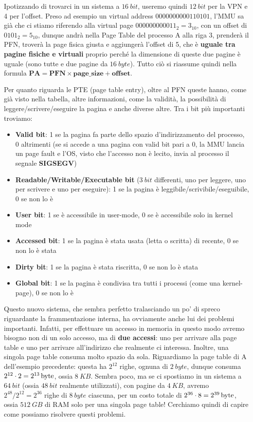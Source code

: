 \documentclass[11pt, a4paper, titlepage, oneside]{scrbook}
\begin{document}
Ipotizzando di trovarci in un sistema a $\SI{16}{bit}$, useremo quindi $\SI{12}{bit}$ per la VPN e 4 per l'offset. Preso ad esempio un virtual address $0000000000110101$, l'MMU sa già che ci stiamo riferendo alla virtual page $000000000011_2 = 3_{10}$, con un offset di $0101_2 = 5_{10}$, dunque andrà nella Page Table del processo A alla riga 3, prenderà il PFN, troverà la page fisica giusta e aggiungerà l'offset di 5, che è \textbf{uguale tra pagine fisiche e virtuali} proprio perché la dimensione di queste due pagine è uguale (sono tutte e due pagine da $\SI{16}{byte}$). Tutto ciò si riassume quindi nella formula $\bm{\textbf{PA} = \textbf{PFN} \times \textbf{page\_size} + \textbf{offset}}$.

Per quanto riguarda le PTE (page table entry), oltre al PFN queste hanno, come già visto nella tabella, altre informazioni, come la validità, la possibilità di leggere/scrivere/eseguire la pagina e anche diverse altre. Tra i bit più importanti troviamo:
\begin{itemize}
    \item \textbf{Valid bit}: 1 se la pagina fa parte dello spazio d'indirizzamento del processo, 0 altrimenti (se si accede a una pagina con valid bit pari a 0, la MMU lancia un page fault e l'OS, visto che l'accesso non è lecito, invia al processo il segnale \textbf{SIGSEGV})
    \item \textbf{Readable/Writable/Executable bit} ($\SI{3}{bit}$ differenti, uno per leggere, uno per scrivere e uno per eseguire): 1 se la pagina è leggibile/scrivibile/eseguibile, 0 se non lo è
    \item \textbf{User bit}: 1 se è accessibile in user-mode, 0 se è accessibile solo in kernel mode
    \item \textbf{Accessed bit}: 1 se la pagina è stata usata (letta o scritta) di recente, 0 se non lo è stata
    \item \textbf{Dirty bit}: 1 se la pagina è stata riscritta, 0 se non lo è stata
    \item \textbf{Global bit}: 1 se la pagina è condivisa tra tutti i processi (come una kernel-page), 0 se non lo è
\end{itemize}


Questo nuovo sistema, che sembra perfetto tralasciando un po' di spreco riguardante la frammentazione interna, ha ovviamente anche lui dei problemi  importanti. Infatti, per effettuare un accesso in memoria in questo modo avremo bisogno non di un solo accesso, ma di \textbf{due accessi}: uno per arrivare alla page table e uno per arrivare all'indirizzo che realmente ci interessa. Inoltre, una singola page table consuma molto spazio da sola. Riguardiamo la page table di A dell'esempio precedente: questa ha $2^{12}$ righe, ognuna di $\SI{2}{byte}$, dunque consuma $2^{12} \cdot 2 = \SI[parse-numbers=false]{2^{13}}{byte}$, ossia $\SI{8}{KB}$. Sembra poco, ma se ci spostiamo in un sistema a $\SI{64}{bit}$ (ossia $\SI{48}{bit}$ realmente utilizzati), con pagine da $\SI{4}{KB}$, avremo $2^{48} / 2^{12} = 2^{36}$ righe di $\SI{8}{byte}$ ciascuna, per un costo totale di $2^{36} \cdot 8 = \SI[parse-numbers=false]{2^{39}}{byte}$, ossia $\SI{512}{GB}$ di RAM solo per una singola page table! Cerchiamo quindi di capire come possiamo risolvere questi problemi.
\end{document}
